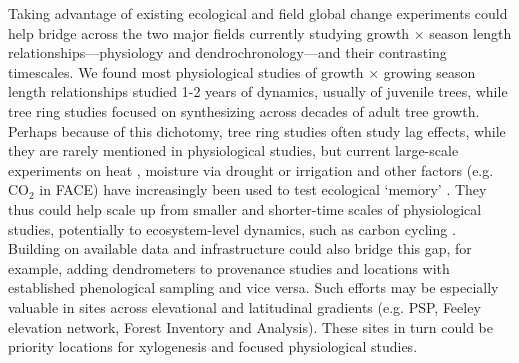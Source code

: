 Taking advantage of existing ecological and field global change experiments could help bridge across the two major fields currently studying growth $\times$ season length relationships---physiology and dendrochronology---and their contrasting timescales. We found most physiological studies of growth $\times$ growing season length relationships studied 1-2 years of dynamics, usually of juvenile trees, while tree ring studies focused on synthesizing across decades of adult tree growth. Perhaps because of this dichotomy, tree ring studies often study lag effects, while they are rarely mentioned in physiological studies, but current large-scale experiments on heat \citep[e.g. SPRUCE,][]{hanson2017attaining}, moisture via drought or irrigation \citep[e.g. DroughtNet, Pfynwald,][]{smith2016drought} and other factors (e.g. $\text{CO}_2$ in FACE) have increasingly been used to test ecological `memory' \citep[e.g. ][]{flinker2021promise, schweiger2022transgenerational}. They thus could help scale up from smaller and shorter-time scales of physiological studies, potentially to ecosystem-level dynamics, such as carbon cycling \citep{ding2021plant,jensen2019simulated}. Building on available data and infrastructure could also bridge this gap, for example, adding dendrometers to provenance studies \citep[or other ways to measure growth, e.g.,][]{montwe2016drought} and locations with established phenological sampling and vice versa. Such efforts may be especially valuable in sites across elevational and latitudinal gradients (e.g. PSP, Feeley elevation network, Forest Inventory and Analysis). These sites in turn could be priority locations for xylogenesis and focused physiological studies. 


